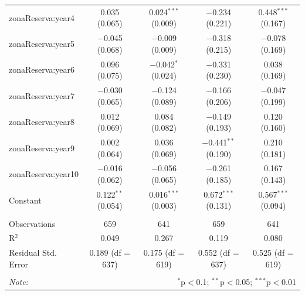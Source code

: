 \documentclass[10pt]{article}
\begin{document}
\begin{table}[h]
\begin{tabular}{@{\extracolsep{1pt}}lcccc}
  zonaReserva:year4 & 0.035 (0.065) & 0.024$^{***}$ (0.009) & $-$0.234 (0.221) & 0.448$^{***}$ (0.167) \\ 
  zonaReserva:year5 & $-$0.045 (0.068) & $-$0.009 (0.009) & $-$0.318 (0.215) & $-$0.078 (0.169) \\ 
  zonaReserva:year6 & 0.096 (0.075) & $-$0.042$^{*}$ (0.024) & $-$0.331 (0.230) & 0.038 (0.169) \\ 
  zonaReserva:year7 & $-$0.030 (0.065) & $-$0.124 (0.089) & $-$0.166 (0.206) & $-$0.047 (0.199) \\ 
  zonaReserva:year8 & 0.012 (0.069) & 0.084 (0.082) & $-$0.149 (0.193) & 0.120 (0.160) \\ 
  zonaReserva:year9 & 0.002 (0.064) & 0.036 (0.069) & $-$0.441$^{**}$ (0.190) & 0.210 (0.181) \\ 
  zonaReserva:year10 & $-$0.016 (0.062) & $-$0.056 (0.065) & $-$0.261 (0.185) & 0.167 (0.143) \\ 
  Constant & 0.122$^{**}$ (0.054) & 0.016$^{***}$ (0.003) & 0.672$^{***}$ (0.131) & 0.567$^{***}$ (0.094) \\ 
 \hline \\[-1.8ex] 
Observations & 659 & 641 & 659 & 641 \\ 
R$^{2}$ & 0.049 & 0.267 & 0.119 & 0.080 \\ 
Residual Std. Error & 0.189 (df = 637) & 0.175 (df = 619) & 0.552 (df = 637) & 0.525 (df = 619) \\ 
\hline 
\hline \\[-1.8ex] 
\textit{Note:}  & \multicolumn{4}{r}{$^{*}$p$<$0.1; $^{**}$p$<$0.05; $^{***}$p$<$0.01} \\ 
\end{tabular} 
\end{table}

\clearpage
\end{document}
